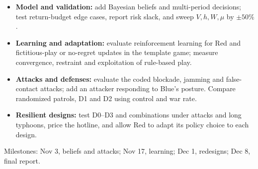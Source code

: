 \begin{itemize}
\item \textbf{Model and validation:} add Bayesian beliefs and multi-period decisions; test return-budget
edge cases, report risk slack, and sweep $V,h,W,\mu$ by $\pm50\%$.
\item \textbf{Learning and adaptation:} evaluate reinforcement learning for Red and fictitious-play or
no-regret updates in the template game; measure convergence, restraint and exploitation of rule-based play.
\item \textbf{Attacks and defenses:} evaluate the coded blockade, jamming and false-contact attacks;
add an attacker responding to Blue's posture. Compare randomized patrols, D1 and D2 using control and war rate.
\item \textbf{Resilient designs:} test D0--D3 and combinations under attacks and long typhoons, price
the hotline, and allow Red to adapt its policy choice to each design.
\end{itemize}
Milestones: Nov 3, beliefs and attacks; Nov 17, learning; Dec 1, redesigns; Dec 8, final report.
